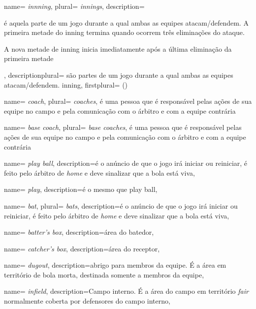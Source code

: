 {
 name= \textit{innning},
 plural= \textit{innings},
 description={ \'e aquela parte de um jogo durante a qual ambas as equipes atacam/defendem. A primeira metade do inning termina quando ocorrem tr\^es elimina\c{c}\~oes do ataque.\par A nova metade de \gls{inning} inicia imediatamente após a última elimina\c{c}\~ao da primeira metade},
 descriptionplural={ s\~ao partes de um jogo durante a qual ambas as equipes atacam/defendem. \gls{inning}},
 firstplural={ ()}
}

{
 name= \textit{coach},
 plural= \textit{coaches},
}{\'e uma pessoa que \'e respons\'avel pelas a\c{c}\~oes de sua equipe no campo e pela comuni\-ca\-\c{c}\~ao com o \'arbitro e com a equipe contr\'aria}

{
 name= \textit{base coach},
 plural= \textit{base coaches},
}{\'e uma pessoa que \'e respons\'avel pelas a\c{c}\~oes de sua equipe no campo e pela comuni\-ca\-\c{c}\~ao com o \'arbitro e com a equipe contr\'aria}


{
 name= \textit{play ball},
 description={\'e o an\'uncio de que o jogo ir\'a iniciar ou reiniciar, \'e feito pelo \'arbitro de \textit{home} e deve sinalizar que a bola est\'a viva},
}

{
 name= \textit{play},
 description={\'e o mesmo que \gls{play ball}},
}

{
 name= \textit{bat},
 plural= \textit{bats},
 description={\'e o an\'uncio de que o jogo ir\'a iniciar ou reiniciar, \'e feito pelo \'arbitro de \textit{home} e deve sinalizar que a bola est\'a viva},
}

{
 name= \textit{batter's box},
 description={\'area do batedor},
}

{
 name= \textit{catcher's box},
 description={\'area do receptor},
}

{
 name= \textit{dugout},
 description={abrigo para membros da equipe. \'E a \'area em territ\'orio de bola morta, destinada somente a membros da equipe},
}

{
 name= \textit{infield},
 description={Campo interno. \'E a \'area do campo em territ\'orio \textit{fair} normalmente coberta por defensores do campo interno},
}


